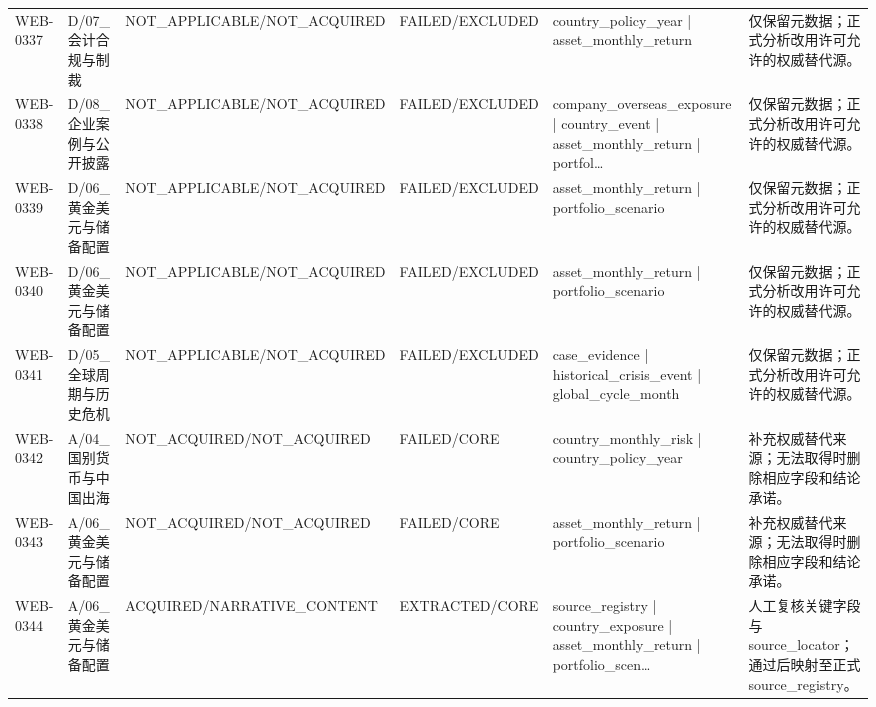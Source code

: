 \begin{landscape}
\begin{longtable}{p{1.8cm}p{2.6cm}p{2.6cm}p{2.6cm}p{4.8cm}p{7.2cm}}
WEB-0337 & D/\allowbreak{}07\_\allowbreak{}会计合规与制裁 & NOT\_\allowbreak{}APPLICABLE/\allowbreak{}NOT\_\allowbreak{}ACQUIRED & FAILED/\allowbreak{}EXCLUDED & country\_\allowbreak{}policy\_\allowbreak{}year | asset\_\allowbreak{}monthly\_\allowbreak{}return & 仅保留元数据；正式分析改用许可允许的权威替代源。\\
WEB-0338 & D/\allowbreak{}08\_\allowbreak{}企业案例与公开披露 & NOT\_\allowbreak{}APPLICABLE/\allowbreak{}NOT\_\allowbreak{}ACQUIRED & FAILED/\allowbreak{}EXCLUDED & company\_\allowbreak{}overseas\_\allowbreak{}exposure | country\_\allowbreak{}event | asset\_\allowbreak{}monthly\_\allowbreak{}return | portfol… & 仅保留元数据；正式分析改用许可允许的权威替代源。\\
WEB-0339 & D/\allowbreak{}06\_\allowbreak{}黄金美元与储备配置 & NOT\_\allowbreak{}APPLICABLE/\allowbreak{}NOT\_\allowbreak{}ACQUIRED & FAILED/\allowbreak{}EXCLUDED & asset\_\allowbreak{}monthly\_\allowbreak{}return | portfolio\_\allowbreak{}scenario & 仅保留元数据；正式分析改用许可允许的权威替代源。\\
WEB-0340 & D/\allowbreak{}06\_\allowbreak{}黄金美元与储备配置 & NOT\_\allowbreak{}APPLICABLE/\allowbreak{}NOT\_\allowbreak{}ACQUIRED & FAILED/\allowbreak{}EXCLUDED & asset\_\allowbreak{}monthly\_\allowbreak{}return | portfolio\_\allowbreak{}scenario & 仅保留元数据；正式分析改用许可允许的权威替代源。\\
WEB-0341 & D/\allowbreak{}05\_\allowbreak{}全球周期与历史危机 & NOT\_\allowbreak{}APPLICABLE/\allowbreak{}NOT\_\allowbreak{}ACQUIRED & FAILED/\allowbreak{}EXCLUDED & case\_\allowbreak{}evidence | historical\_\allowbreak{}crisis\_\allowbreak{}event | global\_\allowbreak{}cycle\_\allowbreak{}month & 仅保留元数据；正式分析改用许可允许的权威替代源。\\
WEB-0342 & A/\allowbreak{}04\_\allowbreak{}国别货币与中国出海 & NOT\_\allowbreak{}ACQUIRED/\allowbreak{}NOT\_\allowbreak{}ACQUIRED & FAILED/\allowbreak{}CORE & country\_\allowbreak{}monthly\_\allowbreak{}risk | country\_\allowbreak{}policy\_\allowbreak{}year & 补充权威替代来源；无法取得时删除相应字段和结论承诺。\\
WEB-0343 & A/\allowbreak{}06\_\allowbreak{}黄金美元与储备配置 & NOT\_\allowbreak{}ACQUIRED/\allowbreak{}NOT\_\allowbreak{}ACQUIRED & FAILED/\allowbreak{}CORE & asset\_\allowbreak{}monthly\_\allowbreak{}return | portfolio\_\allowbreak{}scenario & 补充权威替代来源；无法取得时删除相应字段和结论承诺。\\
WEB-0344 & A/\allowbreak{}06\_\allowbreak{}黄金美元与储备配置 & ACQUIRED/\allowbreak{}NARRATIVE\_\allowbreak{}CONTENT & EXTRACTED/\allowbreak{}CORE & source\_\allowbreak{}registry | country\_\allowbreak{}exposure | asset\_\allowbreak{}monthly\_\allowbreak{}return | portfolio\_\allowbreak{}scen… & 人工复核关键字段与source\_\allowbreak{}locator；通过后映射至正式source\_\allowbreak{}registry。\\

\end{longtable}
\end{landscape}
